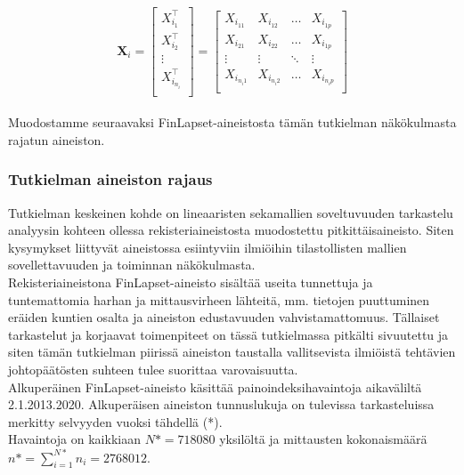 \documentclass[finnish]{docopts}
\begin{document}
$$
\bm{X}_{i} = 
\begin{bmatrix}
X_{i_{1}}^\top \\
X_{i_{2}}^\top  \\
\vdots \\
X_{i_{n_i}}^\top  \\
\end{bmatrix}
=
\begin{bmatrix}
X_{i_{11}} & X_{i_{12}} & \dots & X_{i_{1p}} \\
X_{i_{21}} & X_{i_{22}} & \dots & X_{i_{1p}} \\
\vdots & \vdots & \ddots & \vdots \\
X_{i_{n_i1}} & X_{i_{n_i2}} & \dots & X_{i_{n_ip}} \\
\end{bmatrix}
$$\\

Muodostamme seuraavaksi FinLapset-aineistosta tämän tutkielman näkökulmasta rajatun aineiston.\\

\subsubsection{Tutkielman aineiston rajaus}
\label{ssb:kuvailu}

Tutkielman keskeinen kohde on lineaaristen sekamallien soveltuvuuden tarkastelu analyysin kohteen ollessa rekisteriaineistosta muodostettu pitkittäisaineisto. Siten kysymykset liittyvät aineistossa esiintyviin ilmiöihin tilastollisten mallien sovellettavuuden ja toiminnan näkökulmasta.\\

Rekisteriaineistona FinLapset-aineisto sisältää useita tunnettuja ja tuntemattomia harhan ja mittausvirheen lähteitä, mm. tietojen puuttuminen eräiden kuntien osalta ja aineiston edustavuuden vahvistamattomuus. Tällaiset tarkastelut ja korjaavat toimenpiteet on tässä tutkielmassa pitkälti sivuutettu ja siten tämän tutkielman piirissä aineiston taustalla vallitsevista ilmiöistä tehtävien johtopäätösten suhteen tulee suorittaa varovaisuutta. \\ 

Alkuperäinen FinLapset-aineisto käsittää painoindeksihavaintoja aikaväliltä 2.1.2013.2020. Alkuperäisen aineiston tunnuslukuja on tulevissa tarkasteluissa merkitty selvyyden vuoksi tähdellä (*). \\

Havaintoja on kaikkiaan $N* = 718080$ yksilöltä ja mittausten kokonaismäärä $n* = \sum\limits_{i = 1}^{N*} n_{i} = 2768012$. \\
\end{document}
